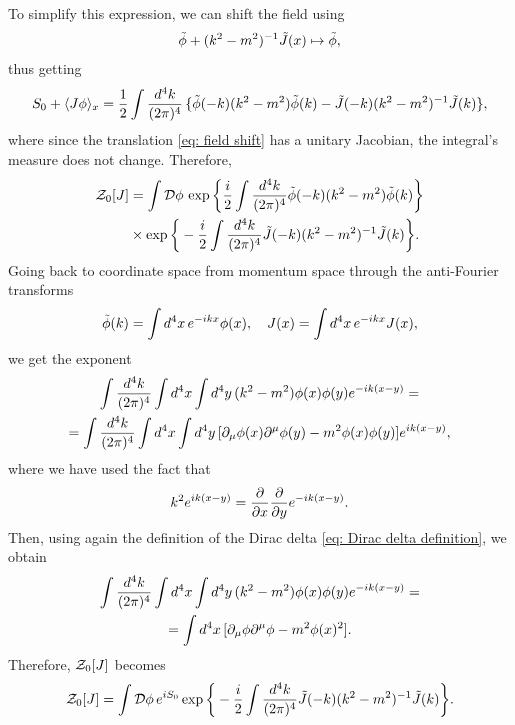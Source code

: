 To simplify this expression, we can shift the field using 
\begin{equation}
\label{eq: field shift}
    \tilde{\phi} + (k^2 - m^2)^{-1}\tilde{J}(x) \mapsto \tilde{\phi},
\end{equation}
thus getting
\begin{equation}
    S_0 + \langle J\phi \rangle_x = \frac{1}{2}\int\frac{d^4k}{(2\pi)^4}\,\{\tilde{\phi}(-k)(k^2 - m^2)\tilde{\phi}(k) - \tilde{J}(-k)(k^2 - m^2)^{-1}\tilde{J}(k)\},
\end{equation}
where since the translation \eqref{eq: field shift} has a unitary Jacobian, the integral's measure does not change. Therefore,
\begin{equation}
    \begin{split}
        \mathcal{Z}_0[J] &= \int \mathcal{D}\phi\,\exp{\bigg\{\frac{i}{2}\int \frac{d^4k}{(2\pi)^4}\tilde{\phi}(-k)(k^2 - m^2)\tilde{\phi}(k)\bigg\}} \\
        &\times \exp{\bigg\{-\frac{i}{2}\int \frac{d^4k}{(2\pi)^4}\tilde{J}(-k)(k^2 - m^2)^{-1}\tilde{J}(k)\bigg\}}.
    \end{split}
\end{equation}
Going back to coordinate space from momentum space through the anti-Fourier transforms
\begin{equation}
    \tilde{\phi}(k) = \int d^4x\,e^{-ikx}\phi(x),\quad J(x) = \int d^4x\,e^{-ikx}J(x),
\end{equation}
we get the exponent 
\begin{multline}
    \int \frac{d^4k}{(2\pi)^4}\int d^4x\int d^4y\,(k^2 - m^2)\phi(x)\phi(y)e^{-ik(x - y)} = \\ 
    = \int \frac{d^4k}{(2\pi)^4}\int d^4x\int d^4y\,[\partial_\mu\phi(x)\partial^\mu\phi(y) - m^2\phi(x)\phi(y)]e^{ik(x - y)},
\end{multline}
where we have used the fact that 
\begin{equation}
    k^2e^{ik(x - y)} = \frac{\partial}{\partial x}\frac{\partial}{\partial y}e^{-ik(x - y)}.
\end{equation}
Then, using again the definition of the Dirac delta \eqref{eq: Dirac delta definition}, we obtain 
\begin{multline}
    \int \frac{d^4k}{(2\pi)^4}\int d^4x\int d^4y\,(k^2 - m^2)\phi(x)\phi(y)e^{-ik(x - y)} = \\ 
    = \int d^4x\,[\partial_\mu\phi\partial^\mu\phi - m^2\phi(x)^2].
\end{multline}
Therefore, $\mathcal{Z}_0[J]$ becomes 
\begin{equation}
    \mathcal{Z}_0[J] = \int \mathcal{D}\phi\,e^{iS_0} \exp{\bigg\{-\frac{i}{2}\int \frac{d^4k}{(2\pi)^4} \tilde{J}(-k)(k^2 - m^2)^{-1}\tilde{J}(k)\bigg\}}.
\end{equation}
